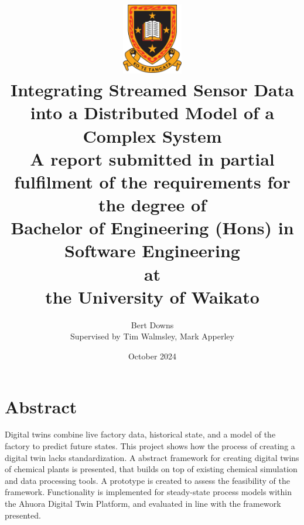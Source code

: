 \documentclass[12pt]{report}
\title{ \includegraphics[width=0.2\textwidth]{uow_logo.png} \\
Integrating Streamed Sensor Data into a Distributed Model of a Complex System \\
\large{A report submitted in partial fulfilment of the requirements for the degree of \\
\textbf{Bachelor of Engineering (Hons) in Software Engineering} \\
at \\
\textbf{the University of Waikato}\\
}}
\author{Bert Downs  \\ 
Supervised by Tim Walmsley, Mark Apperley }
\date{October 2024}
\begin{document}


\maketitle


\chapter*{Abstract}

Digital twins combine live factory data, historical state, and a model of the factory to predict future states. This project shows how the process of creating a digital twin lacks standardization. A abstract framework for creating digital twins of chemical plants is presented, that builds on top of existing chemical simulation and data processing tools. A prototype is created to assess the feasibility of the framework. Functionality is implemented for steady-state process models within the Ahuora Digital Twin Platform, and evaluated in line with the framework presented.
\end{document}
